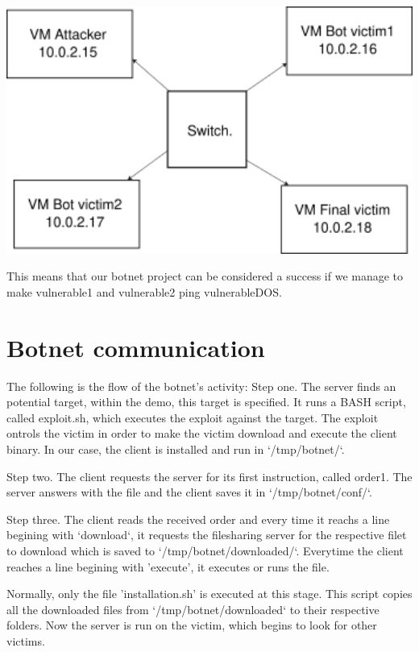 \documentclass[../main.tex]{subfiles}
\begin{document}
    \includegraphics[width=450pt]{lab_env.png}

    This means that our botnet project can be considered a success if we manage to make vulnerable1 and vulnerable2 ping vulnerableDOS.


    \vspace{10pt}

    \section{Botnet communication}

    The following is the flow of the botnet's activity:
    Step one. 
    The server finds an potential target, within the demo, this target is specified.
    It runs a BASH script, called exploit.sh, which executes the exploit against the target.
    The exploit ontrols the victim in order to make the victim download and execute the client binary.
    In our case, the client is installed and run in `/tmp/botnet/`.

    Step two.
    The client requests the server for its first instruction, called order1.
    The server answers with the file and the client saves it in `/tmp/botnet/conf/`.

    Step three.
    The client reads the received order and every time it reachs a line begining with `download`, it requests the filesharing server for the respective filet to download which is saved to `/tmp/botnet/downloaded/`.
    Everytime the client reaches a line begining with 'execute', it executes or runs the file.

    Normally, only the file 'installation.sh' is executed at this stage.
    This script copies all the downloaded files from `/tmp/botnet/downloaded` to their respective folders.
    Now the server is run on the victim, which begins to look for other victims.
\end{document}

